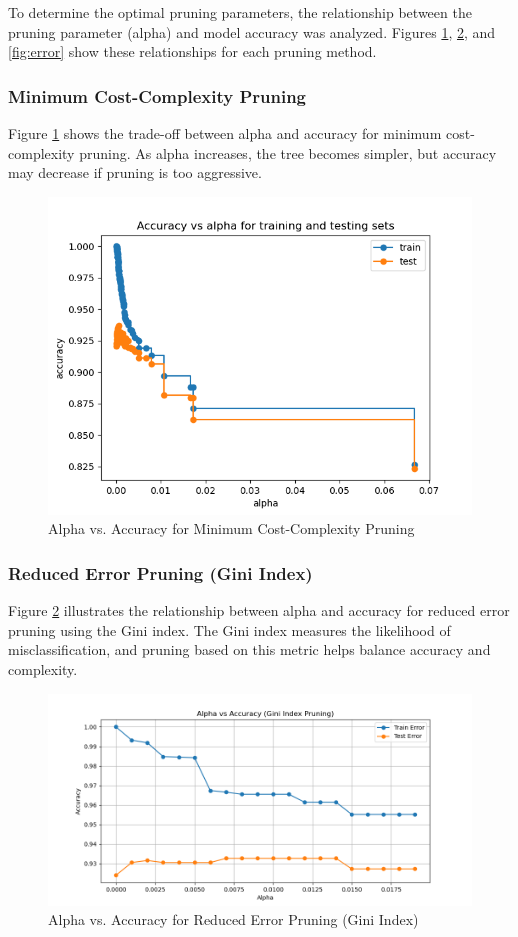\documentclass[12pt]{article}
\begin{document}
To determine the optimal pruning parameters, the relationship between the pruning parameter (alpha) and model accuracy was analyzed. Figures \ref{fig:mcc}, \ref{fig:gini}, and \ref{fig:error} show these relationships for each pruning method.

\subsubsection{Minimum Cost-Complexity Pruning}
Figure \ref{fig:mcc} shows the trade-off between alpha and accuracy for minimum cost-complexity pruning. As alpha increases, the tree becomes simpler, but accuracy may decrease if pruning is too aggressive.

\begin{figure}[h!]
    \centering
    \includegraphics[width=0.8\linewidth]{figures/CCP/Accuracy vs alpha for train and test sets.png}
    \caption{Alpha vs. Accuracy for Minimum Cost-Complexity Pruning}
    \label{fig:mcc}
\end{figure}

\subsubsection{Reduced Error Pruning (Gini Index)}
Figure \ref{fig:gini} illustrates the relationship between alpha and accuracy for reduced error pruning using the Gini index. The Gini index measures the likelihood of misclassification, and pruning based on this metric helps balance accuracy and complexity.

\begin{figure}[h!]
    \centering
    \includegraphics[width=0.8\linewidth]{figures/Reduced Error Pruning/gini alpha vs accuracy.png}
    \caption{Alpha vs. Accuracy for Reduced Error Pruning (Gini Index)}
    \label{fig:gini}
\end{figure}
\end{document}
